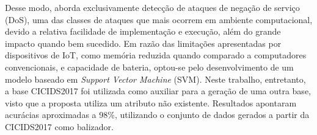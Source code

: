 Desse modo,  aborda exclusivamente detecção de ataques de negação de serviço (DoS), uma das classes de ataques que mais ocorrem em ambiente computacional, devido a relativa facilidade de implementação e execução, além do grande impacto quando bem sucedido. Em razão das limitações apresentadas por dispositivos de IoT, como memória reduzida quando comparado a computadores convencionais, e capacidade de bateria, optou-se pelo desenvolvimento de um modelo baseado em \textit{Support Vector Machine} (SVM). Neste trabalho, entretanto, a base CICIDS2017 foi utilizada como auxiliar para a geração de uma outra base, visto que a proposta utiliza um atributo não existente. Resultados apontaram acurácias aproximadas a 98\%, utilizando o conjunto de dados gerados a partir da CICIDS2017 como balizador.
